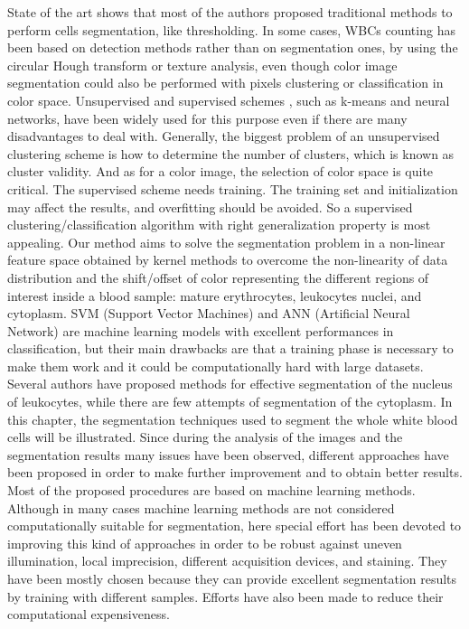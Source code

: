 {	State of the art shows that most of the authors proposed traditional methods to perform cells segmentation, like thresholding. In some cases, WBCs counting has been based on detection methods rather than on segmentation ones, by using the circular Hough transform \cite{Mahmood} or texture analysis, even though color image segmentation could also be performed with pixels clustering or classification in color space. Unsupervised and supervised schemes \cite{Pan}, such as k-means and neural networks, have been widely used for this purpose even if there are many disadvantages to deal with. Generally, the biggest problem of an unsupervised clustering scheme is how to determine the number of clusters, which is known as cluster validity. And as for a color image, the selection of color space is quite critical. The supervised scheme needs training. The training set and initialization may affect the results, and overfitting should be avoided. So a supervised clustering/classification algorithm with right generalization property is most appealing. Our method aims to solve the segmentation problem in a non-linear feature space obtained by kernel methods to overcome the non-linearity of data distribution and the shift/offset of color representing the different regions of interest inside a blood sample: mature erythrocytes, leukocytes nuclei, and cytoplasm. SVM (Support Vector Machines) and ANN (Artificial Neural Network) are machine learning models with excellent performances in classification, but their main drawbacks are that a training phase is necessary to make them work and it could be computationally hard with large datasets.
	Several authors have proposed methods for effective segmentation of the nucleus of leukocytes, while there are few attempts of segmentation of the cytoplasm. In this chapter, the segmentation techniques used to segment the whole white blood cells will be illustrated. Since during the analysis of the images and the segmentation results many issues have been observed, different approaches have been proposed in order to make further improvement and to obtain better results. Most of the proposed procedures are based on machine learning methods. Although in many cases machine learning methods are not considered computationally suitable for segmentation, here special effort has been devoted to improving this kind of approaches in order to be robust against uneven illumination, local imprecision, different acquisition devices, and staining. They have been mostly chosen because they can provide excellent segmentation results by training with different samples. Efforts have also been made to reduce their computational expensiveness.
	
}
